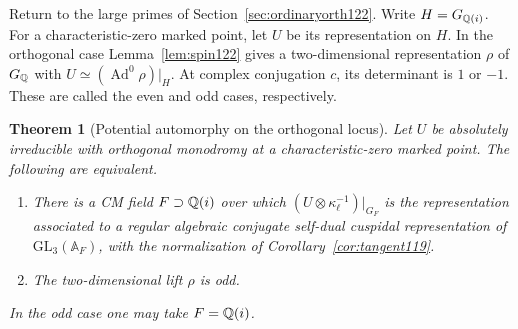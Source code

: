 \documentclass[a4paper,11pt]{article}
\newtheorem{theorem}[proposition]{Theorem}
\theoremstyle{definition}
\theoremstyle{remark}
\numberwithin{equation}{section}
\begin{document}
Return to the large primes of Section~\ref{sec:ordinaryorth122}.
Write \(H=G_{\mathbb Q(i)}\). For a characteristic-zero marked point,
let \(U\) be its representation on \(H\). In the orthogonal case
Lemma~\ref{lem:spin122} gives a two-dimensional representation
\(\rho\) of \(G_\mathbb Q\) with \(U\simeq(\operatorname{Ad}^0\rho)|_H\).
At complex conjugation \(c\), its determinant is \(1\) or \(-1\).
These are called the even and odd cases, respectively.

\begin{theorem}[Potential automorphy on the orthogonal locus]
\label{thm:paritydescent358}
Let \(U\) be absolutely irreducible with orthogonal monodromy
at a characteristic-zero marked point. The following are equivalent.
\begin{enumerate}
\item There is a CM field \(F\supset\mathbb Q(i)\) over which
      \((U\otimes\kappa_\ell^{-1})|_{G_F}\) is the representation
      associated to a regular algebraic conjugate self-dual
      cuspidal representation of \(\mathrm{GL}_3(\mathbb A_F)\),
      with the normalization of Corollary~\ref{cor:tangent119}.
\item The two-dimensional lift \(\rho\) is odd.
\end{enumerate}
In the odd case one may take \(F=\mathbb Q(i)\).
\end{theorem}
\end{document}
